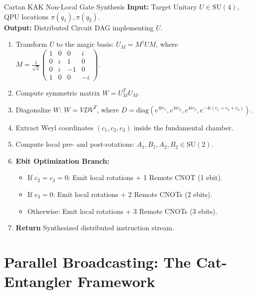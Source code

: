 \begin{algorithmbox}{Cartan KAK Non-Local Gate Synthesis}
\textbf{Input:} Target Unitary $U \in \mathrm{SU}(4)$, QPU locations $\pi(q_1), \pi(q_2)$.\\
\textbf{Output:} Distributed Circuit DAG implementing $U$.

\begin{enumerate}[leftmargin=1.5em]
    \item Transform $U$ to the magic basis: $U_M = M^\dagger U M$, where $M = \frac{1}{\sqrt{2}} \begin{pmatrix} 1 & 0 & 0 & i \\ 0 & i & 1 & 0 \\ 0 & i & -1 & 0 \\ 1 & 0 & 0 & -i \end{pmatrix}$.
    \item Compute symmetric matrix $W = U_M^T U_M$.
    \item Diagonalize $W$: $W = V D V^T$, where $D = \text{diag}(e^{4i c_1}, e^{4i c_2}, e^{4i c_3}, e^{-4i(c_1+c_2+c_3)})$.
    \item Extract Weyl coordinates $(c_1, c_2, c_3)$ inside the fundamental chamber.
    \item Compute local pre- and post-rotations: $A_1, B_1, A_2, B_2 \in \mathrm{SU}(2)$.
    \item \textbf{Ebit Optimization Branch:}
    \begin{itemize}
        \item If $c_2 = c_3 = 0$: Emit local rotations + 1 Remote CNOT (1 ebit).
        \item If $c_3 = 0$: Emit local rotations + 2 Remote CNOTs (2 ebits).
        \item Otherwise: Emit local rotations + 3 Remote CNOTs (3 ebits).
    \end{itemize}
    \item \textbf{Return} Synthesized distributed instruction stream.
\end{enumerate}
\end{algorithmbox}

\section{Parallel Broadcasting: The Cat-Entangler Framework}
\label{sec:cat_entangler_framework}


